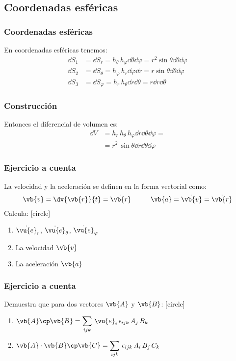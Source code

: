 \subsection*{Coordenadas esféricas}
\begin{frame}
\frametitle{Coordenadas esféricas}
En coordenadas esféricas tenemos:
\begin{align*}
\dd{S_{1}} &= \dd{S_{r}} = h_{\theta} \, h_{\varphi} \dd{\theta} \dd{\varphi} = r^{2} \sin \theta \dd{\theta} \dd{\varphi} \\[0.5em]
\dd{S_{2}} &= \dd{S_{\theta}} = h_{\varphi} \, h_{r} \dd{\varphi} \dd{r} = r \sin \theta \dd{\theta} \dd{\varphi} \\[0.5em]
\dd{S_{3}} &= \dd{S_{\varphi}} = h_{r} \, h_{\theta} \dd{r} \dd{\theta} = r \dd{r} \dd{\theta}
\end{align*}
\end{frame}
\begin{frame}
\frametitle{Construcción}
Entonces el diferencial de volumen es:
\begin{align*}
\dd{V} &= h_{r} \, h_{\theta} \, h_{\varphi} \dd{r} \dd{\theta} \dd{\varphi} = \\[0.5em]
&= r^{2} \, \sin \theta \dd{r} \dd{\theta} \dd{\varphi}
\end{align*}
\end{frame}
\begin{frame}
\frametitle{Ejercicio a cuenta}
La velocidad y la aceleración se definen en la forma vectorial como:
\begin{align*}
\vb{v} = \dv{\vb{r}}{t} = \dot{\vb{r}} \hspace{1cm} \vb{a} = \dot{\vb{v}} = \ddot{\vb{r}}
\end{align*}
Calcula:
[circle]
\begin{enumerate}
\item $\dot{\vu{e}}_{r}$, $\dot{\vu{e}}_{\theta}$, $\dot{\vu{e}}_{\varphi}$ 
\item La velocidad $\vb{v}$
\item La aceleración $\vb{a}$
\end{enumerate}
\end{frame}
\begin{frame}
\frametitle{Ejercicio a cuenta}
Demuestra que para dos vectores $\vb{A}$ y $\vb{B}$:
[circle]
\begin{enumerate}
\item $\vb{A} \cp \vb{B} = \displaystyle \sum_{ijk} \, \vu{e}_{i} \, \epsilon_{ijk} \, A_{j} \, B_{k}$ \\[1em]
\item $\vb{A} \cdot \vb{B} \cp \vb{C} = \displaystyle \sum_{ijk} \, \epsilon_{ijk} \, A_{i} \, B_{j} \, C_{k}$
\end{enumerate}
\end{frame}
